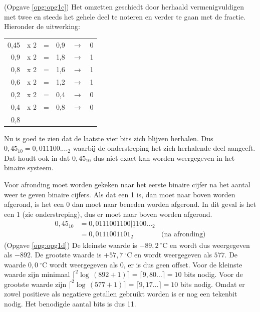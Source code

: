 \documentclass[a4paper,12pt,addpoints,fleqn,dutch]{tisdexam}
\begin{document}
\begin{questions}
(Opgave \ref{opg:opg1c}) Het omzetten geschiedt door herhaald vermenigvuldigen
met twee en steeds het gehele deel te noteren en verder te gaan met de fractie.
Hieronder de uitwerking:

\begin{table}[H]
  \begin{tabular}{ r c c r c c }
  0,45 & x 2 & = & 0,9 & $\rightarrow$ & 0 \\
   0,9 & x 2 & = & 1,8 & $\rightarrow$ & 1 \\
   0,8 & x 2 & = & 1,6 & $\rightarrow$ & 1 \\
   0,6 & x 2 & = & 1,2 & $\rightarrow$ & 1 \\
   0,2 & x 2 & = & 0,4 & $\rightarrow$ & 0 \\
   0,4 & x 2 & = & 0,8 & $\rightarrow$ & 0 \\
   \underline{0,8} &     &   &     &               &
  \end{tabular}
\end{table}

Nu is goed te zien dat de laatste vier bits zich blijven herhalen. Dus
$0,45_{10} = 0,01\underline{1100}...._{2}$ waarbij de onderstreping het
zich herhalende deel aangeeft. Dat houdt ook in dat $0,45_{10}$ dus niet
exact kan worden weergegeven in het binaire systeem.

Voor afronding moet worden gekeken naar het eerste binaire cijfer na het
aantal weer te geven binaire cijfers. Als dat een 1 is, dan moet naar
boven worden afgerond, is het een 0 dan moet naar beneden worden afgerond.
In dit geval is het een 1 (zie onderstreping), dus er moet naar boven worden
afgerond.
\begin{equation*}
\begin{split}
0,45_{10} &= 0,0111001100|\underline{1}100..._{2} \\
          &= 0,0111001101_{2} \qquad \qquad \text{(na afronding)}
\end{split}
\end{equation*}
(Opgave \ref{opg:opg1d}) De kleinste waarde is $-89,2\ ^{\circ}$C en wordt
dus weergegeven als $-892$. De grootste waarde is $+57,7\ ^{\circ}$C en wordt
weergegeven als $577$. De waarde $0,0\ ^{\circ}$C wordt weergegeven als $0$,
er is dus geen offset. Voor de kleinste waarde zijn minimaal
$\lceil ^{2}\log\,(892+1) \rceil = \lceil 9,80\ldots \rceil = 10$ bits nodig.
Voor de grootste waarde zijn $\lceil ^{2}\log\,(577+1) \rceil = \lceil 
9,17\ldots \rceil = 10$ bits nodig. Omdat er zowel positieve als negatieve
getallen gebruikt worden is er nog een tekenbit nodig. Het benodigde aantal
bits is dus 11.



\end{questions}
\end{document}
